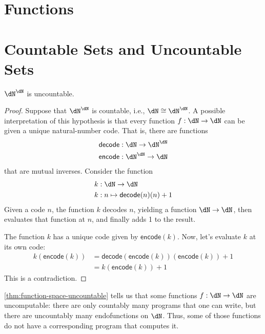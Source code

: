\documentclass{amsart}
\begin{document}
\section{Functions}
\label{sec:functions}

\section{Countable Sets and Uncountable Sets}
\label{sec:countable-sets-and-uncountable-sets}

\begin{thm}\label{thm:function-space-uncountable}
  $\dN^{\dN}$ is uncountable.
\end{thm}
\begin{proof}
  Suppose that $\dN^{\dN}$ is countable, i.e., $\dN \iso \dN^{\dN}$.
  A possible interpretation of this hypothesis is that every function $f : \dN \to \dN$ can be given a unique natural-number code.
  That is, there are functions
  \begin{align}
    \mathsf{decode} &: \dN \to \dN^{\dN}\\
    \mathsf{encode} &: \dN^{\dN} \to \dN
  \end{align}
  that are mutual inverses.
  Consider the function
  \begin{align}
    k &: \dN \to \dN\\
    k &: n \mapsto \mathsf{decode}(n)(n) + 1
  \end{align}
  Given a code $n$, the function $k$ decodes $n$, yielding a function $\dN \to \dN$, then evaluates that function at $n$, and finally adds 1 to the result.

  The function $k$ has a unique code given by $\mathsf{encode}(k)$.
  Now, let's evaluate $k$ at its own code:
  \begin{align}
    k(\mathsf{encode}(k)) &= \mathsf{decode}(\mathsf{encode}(k))(\mathsf{encode}(k)) + 1\\
                          &= k(\mathsf{encode}(k)) + 1
  \end{align}
  This is a contradiction.
\end{proof}

\cref{thm:function-space-uncountable} tells us that some functions $f : \dN \to \dN$ are uncomputable: there are only countably many programs that one can write, but there are uncountably many endofunctions on $\dN$. Thus, some of those functions do not have a corresponding program that computes it.
\end{document}
